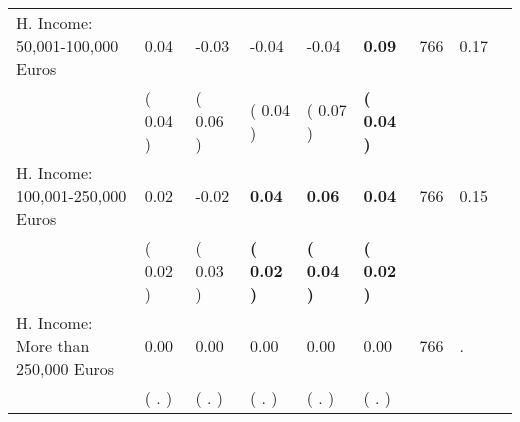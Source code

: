\begin{tabular}{L{6.2cm} C{1.8cm} C{1.8cm} C{1.8cm} C{1.8cm} C{1.8cm} C{1.8cm} C{0.3cm} C{0.3cm}}
H. Income: 50,001-100,000 Euros &      0.04 &     -0.03 &     -0.04 &     -0.04 & \textbf{     0.09}  & 766 &       0.17 \\ 
 & (     0.04 ) & (     0.06 ) & (     0.04 ) & (     0.07 ) & \textbf{(     0.04 )}  & \\
H. Income: 100,001-250,000 Euros &      0.02 &     -0.02 & \textbf{     0.04} & \textbf{     0.06} & \textbf{     0.04}  & 766 &       0.15 \\ 
 & (     0.02 ) & (     0.03 ) & \textbf{(     0.02 )} & \textbf{(     0.04 )} & \textbf{(     0.02 )}  & \\
H. Income: More than 250,000 Euros &      0.00 &      0.00 &      0.00 &      0.00 &      0.00  & 766 &          . \\ 
 & (        . ) & (        . ) & (        . ) & (        . ) & (        . )  & \\
\bottomrule
\end{tabular}

